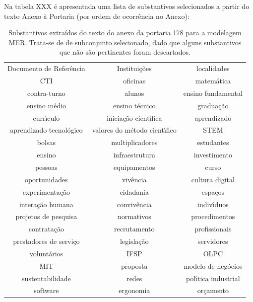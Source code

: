 \documentclass[
12pt,		%
openright,	%
twoside,  %
a4paper,			%
chapter=TITLE,		%
english,			%
french,				%
spanish,			%
brazil				%
]{USPSC-classe/USPSC}
\begin{document}
Na tabela XXX \'e apresentada uma lista de substantivos selecionados a partir do texto Anexo \`a Portaria (por ordem de ocorr\^encia no Anexo):













\begin{table}[htb]
\tiny
\caption{\label{4323829d8b7f5162f6cfb58db4d222366e959840}Substantivos extra\'{i}dos do texto do anexo da portaria 178 para a modelagem MER. Trata-se de de subconjunto selecionado, dado que alguns substantivos que n\~ao s\~ao pertinentes foram descartados.}

\centering
\begin{tabular}{|c|c|c|}
\hline
Documento de Refer\^encia  &  Institui\c{c}\~oes  &  localidades \\
CTI  &  oficinas  &  matem\'atica  \\
contra-turno  &  alunos  &  ensino fundamental \\
ensino m\'edio  &  ensino t\'ecnico  &  gradua\c{c}\~ao \\
curr\'{\i}culo  &  inicia\c{c}\~ao cient\'{\i}fica  &  aprendizado \\
aprendizado tecnol\'ogico  &  valores do m\'etodo cient\'{\i}fico  &  STEM \\
bolsas  &  multiplicadores  &  estudantes \\
ensino  &  infraestrutura  &  investimento \\
pessoas  &  equipamentos  &  curso \\
oportunidades  &  viv\^encia  &  cultura digital \\
experimenta\c{c}\~ao  &  cidadania  &  espa\c{c}os \\
intera\c{c}\~ao humana  &  conviv\^encia  &  indiv\'{\i}duos  \\
projetos de pesquisa  &  normativos  &  procedimentos \\
contrata\c{c}\~ao  &  recrutamento  &  profissionais \\
prestadores de servi\c{c}o  &  legisla\c{c}\~ao  &  servidores \\
volunt\'arios  &  IFSP  &  OLPC \\
MIT  &  proposta  &  modelo de neg\'ocios \\
sustentabilidade  &  redes  &  pol\'{\i}tica industrial \\
software  &  ergonomia  &  or\c{c}amento \\

\end{tabular}
\end{table}
\end{document}
